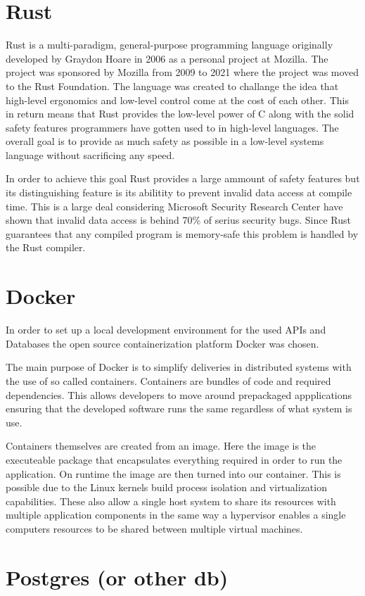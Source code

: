 \section{Rust}
Rust is a multi-paradigm, general-purpose programming language originally developed by Graydon Hoare in 2006 as a personal project at Mozilla. The project was sponsored by Mozilla from 2009 to 2021 where the project was moved to the Rust Foundation. 
The language was created to challange the idea that high-level ergonomics and low-level control come at the cost of each other\cite{Rust_Book}. 
This in return means that Rust provides the low-level power of C along with the solid safety features programmers have gotten used to in high-level languages. The overall goal is to provide as much safety as possible in a low-level systems language without sacrificing any speed\cite{Rust_in_Action}. 

In order to achieve this goal Rust provides a large ammount of safety features but its distinguishing feature is its abilitity to prevent invalid data access at compile time. 
This is a large deal considering Microsoft Security Research Center have shown that invalid data access is behind 70\% of serius security bugs\cite{Safe_Systems_Languages}. 
Since Rust guarantees that any compiled program is memory-safe this problem is handled by the Rust compiler. 


\section{Docker}
In order to set up a local development environment for the used APIs and Databases the open source containerization platform Docker was chosen. 

The main purpose of Docker is to simplify deliveries in distributed systems with the use of so called containers\cite{Docker_Container}.
Containers are bundles of code and required dependencies. This allows developers to move around prepackaged appplications ensuring that the developed software runs the same regardless of what system is use\cite{Docker_Container}.

Containers themselves are created from an image. Here the image is the executeable package that encapsulates everything required in order to run the application. On runtime the image are then turned into our container. 
This is possible due to the Linux kernels build process isolation and virtualization capabilities. These also allow a single host system to share its resources with multiple application components in the same way a hypervisor enables a single computers resources to be shared between multiple virtual machines\cite{Docker_Container}. 



\section{Postgres (or other db)} %

